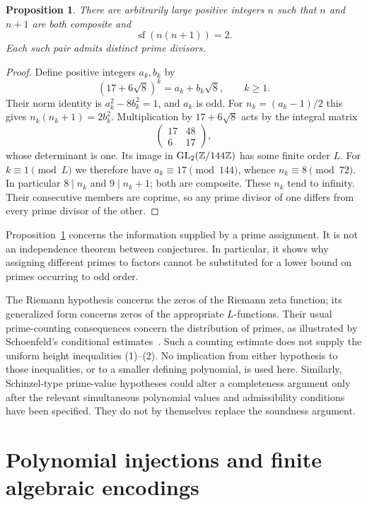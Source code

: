 \documentclass[11pt,a4paper]{article}
\newtheorem{proposition}[theorem]{Proposition}
\DeclareMathOperator{\sfpart}{sf}
\begin{document}
\begin{proposition}\label{prop:pell}
There are arbitrarily large positive integers $n$ such that
$n$ and $n+1$ are both composite and
\[
                    \sfpart(n(n+1))=2.
\]
Each such pair admits distinct prime divisors.
\end{proposition}
\begin{proof}
Define positive integers $a_k,b_k$ by
\[
 (17+6\sqrt8)^k=a_k+b_k\sqrt8,\qquad k\ge1.
\]
Their norm identity is $a_k^2-8b_k^2=1$, and $a_k$ is odd.
For $n_k=(a_k-1)/2$ this gives
$n_k(n_k+1)=2b_k^2$.
Multiplication by $17+6\sqrt8$ acts by the integral matrix
\[
 \begin{pmatrix}17&48\\6&17\end{pmatrix},
\]
whose determinant is one. Its image in
$\mathrm{GL}_2(\mathbb Z/144\mathbb Z)$ has some finite order $L$.
For $k\equiv1\pmod L$ we therefore have
$a_k\equiv17\pmod{144}$, whence $n_k\equiv8\pmod{72}$.
In particular $8\mid n_k$ and $9\mid n_k+1$; both are
composite. These $n_k$ tend to infinity. Their consecutive
members are coprime, so any prime divisor of one differs
from every prime divisor of the other.
\end{proof}

Proposition~\ref{prop:pell} concerns the information supplied
by a prime assignment. It is not an independence theorem
between conjectures. In particular, it shows why assigning
different primes to factors cannot be substituted for a
lower bound on primes occurring to odd order.

The Riemann hypothesis concerns the zeros of the Riemann zeta
function; its generalized form concerns zeros of the appropriate
$L$-functions. Their usual prime-counting consequences concern
the distribution of primes, as illustrated by
Schoenfeld's conditional estimates~\cite{Schoenfeld}.
Such a counting estimate does not supply the uniform height
inequalities (1)--(2). No implication from either hypothesis
to those inequalities, or to a smaller defining polynomial,
is used here. Similarly, Schinzel-type prime-value hypotheses
could alter a completeness argument only after the relevant
simultaneous polynomial values and admissibility conditions
have been specified. They do not by themselves replace the
soundness argument.

\section{Polynomial injections and finite algebraic encodings}
\end{document}
